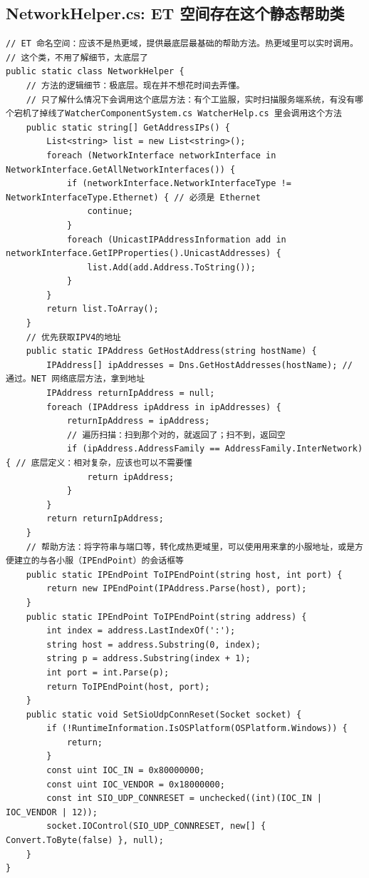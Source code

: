 \documentclass[9pt, b5paper]{article}
\begin{document}
\subsection{NetworkHelper.cs: ET 空间存在这个静态帮助类}
\label{sec:org218296d}
\begin{verbatim}
// ET 命名空间：应该不是热更域，提供最底层最基础的帮助方法。热更域里可以实时调用。
// 这个类，不用了解细节，太底层了
public static class NetworkHelper {
    // 方法的逻辑细节：极底层。现在并不想花时间去弄懂。
    // 只了解什么情况下会调用这个底层方法：有个工监服，实时扫描服务端系统，有没有哪个宕机了掉线了WatcherComponentSystem.cs WatcherHelp.cs 里会调用这个方法
    public static string[] GetAddressIPs() {
        List<string> list = new List<string>();
        foreach (NetworkInterface networkInterface in NetworkInterface.GetAllNetworkInterfaces()) {
            if (networkInterface.NetworkInterfaceType != NetworkInterfaceType.Ethernet) { // 必须是 Ethernet
                continue;
            }
            foreach (UnicastIPAddressInformation add in networkInterface.GetIPProperties().UnicastAddresses) {
                list.Add(add.Address.ToString());
            }
        }
        return list.ToArray();
    }
    // 优先获取IPV4的地址
    public static IPAddress GetHostAddress(string hostName) {
        IPAddress[] ipAddresses = Dns.GetHostAddresses(hostName); // 通过。NET 网络底层方法，拿到地址
        IPAddress returnIpAddress = null;
        foreach (IPAddress ipAddress in ipAddresses) {
            returnIpAddress = ipAddress;
            // 遍历扫描：扫到那个对的，就返回了；扫不到，返回空
            if (ipAddress.AddressFamily == AddressFamily.InterNetwork) { // 底层定义：相对复杂，应该也可以不需要懂
                return ipAddress;
            }
        }
        return returnIpAddress;
    }
    // 帮助方法：将字符串与端口等，转化成热更域里，可以使用用来拿的小服地址，或是方便建立的与各小服（IPEndPoint）的会话框等
    public static IPEndPoint ToIPEndPoint(string host, int port) {
        return new IPEndPoint(IPAddress.Parse(host), port);
    }
    public static IPEndPoint ToIPEndPoint(string address) {
        int index = address.LastIndexOf(':');
        string host = address.Substring(0, index);
        string p = address.Substring(index + 1);
        int port = int.Parse(p);
        return ToIPEndPoint(host, port);
    }
    public static void SetSioUdpConnReset(Socket socket) {
        if (!RuntimeInformation.IsOSPlatform(OSPlatform.Windows)) {
            return;
        }
        const uint IOC_IN = 0x80000000;
        const uint IOC_VENDOR = 0x18000000;
        const int SIO_UDP_CONNRESET = unchecked((int)(IOC_IN | IOC_VENDOR | 12));
        socket.IOControl(SIO_UDP_CONNRESET, new[] { Convert.ToByte(false) }, null);
    }
}
\end{verbatim}
\end{document}

